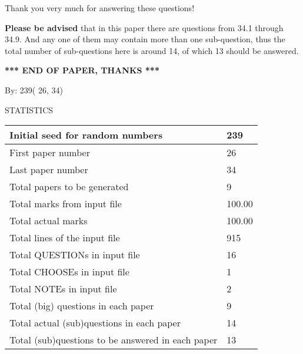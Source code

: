 \documentclass[12pt]{article}
\begin{document}
 
 
 
Thank you very much for answering these questions!
 
{\textbf{\large{Please be advised}}} that in this paper there are questions from
34.1 through
34.9.
And any one of them may contain more than one sub-question, thus the total number
of sub-questions here is around 14, of which
13 should be answered.
 
   
   
   
   
\vspace{1.0in} 
{\textbf{\large{ *** END OF PAPER, THANKS *** }}} 
   
   
\hspace{1.0in} By: 
         239(         26,          34)
   
   
   
\vspace{0.2in}
\vspace{0.2in}
   
   
 \newpage
\setcounter{page}{1} 
   
   
 {\LARGE{STATISTICS}}
   
\vspace{0.2in}
   
 \begin{tabular}{|l|l|}
 \hline
 Initial seed for random numbers &        239 \\
\hline
 First paper number &         26 \\
\hline
 Last  paper number &         34 \\
\hline
 Total papers to be generated &          9 \\
\hline
Total marks from input file & 100.00 \\
\hline
Total actual marks & 100.00 \\
\hline
 Total lines of the input file &        915 \\
 \hline
 Total QUESTIONs in input file &         16 \\
\hline
 Total CHOOSEs in input file &          1 \\
\hline
 Total NOTEs in input file &          2 \\
\hline
 Total (big) questions in each paper &          9 \\
\hline
 Total actual (sub)questions in each paper &         14 \\
\hline
 Total (sub)questions to be answered in each paper &         13 \\
\hline
 \end{tabular}
   
\end{document}
